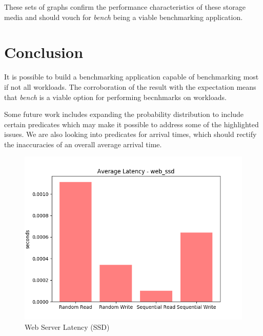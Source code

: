 \documentclass[10pt, author, twocolumn]{article}
\begin{document}
These sets of graphs confirm the performance characteristics of these storage media and should vouch for \textit{bench} being a viable benchmarking application.

\section{Conclusion}
It is possible to build a benchmarking application capable of benchmarking most if not all workloads. The corroboration of the result with the expectation means that \textit{bench} is a viable option for performing becnhmarks on workloads. 

Some future work includes expanding the probability distribution to include certain predicates which may make it possible to address some of the highlighted issues. We are also looking into predicates for arrival times, which should rectify the inaccuracies of an overall average arrival time.

\newpage
\begin{figure}[t!]
    \includegraphics[scale=0.5]{../graphs/web_ssd-lat.png}
    \caption{Web Server Latency (SSD)}
    \label{fig:ssd_web_lat}
\end{figure}
\end{document}
